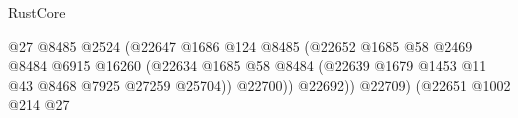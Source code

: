 \begin{lexlean}{RustCore}
\begin{coremodule}
                                                                    @27
                                                                    @8485
                                                                    @2524
                                                                    (@22647
                                                                      @1686
                                                                      @124
                                                                      @8485
                                                                      (@22652
                                                                        @1685
                                                                        @58
                                                                        @2469
                                                                        @8484
                                                                        @6915
                                                                        @16260
                                                                        (@22634
                                                                          @1685
                                                                          @58
                                                                          @8484
                                                                          (@22639
                                                                            @1679
                                                                            @1453
                                                                            @11
                                                                            @43
                                                                            @8468
                                                                            @7925
                                                                            @27259
                                                                            @25704))
                                                                        @22700))
                                                                    @22692))
                                                                @22709)
                                                              (@22651
                                                                @1002
                                                                @214
                                                                @27

\end{coremodule}
\end{lexlean}
